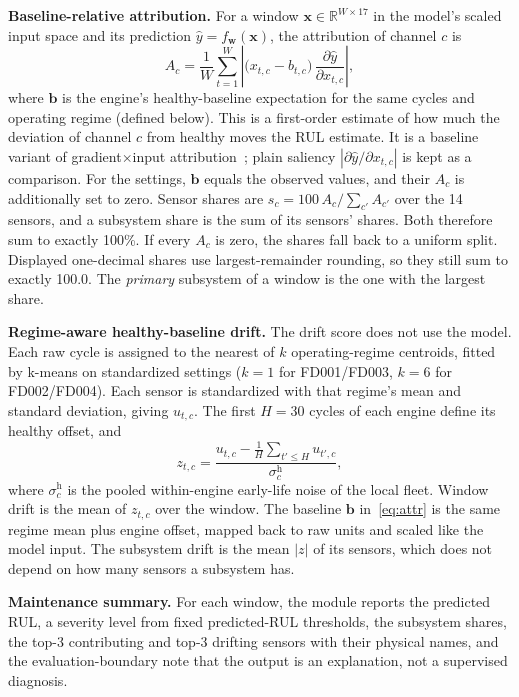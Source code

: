 \textbf{Baseline-relative attribution.} For a window $\mathbf{x}\in\mathbb{R}^{W\times 17}$ in the model's scaled input space and its prediction $\hat y=f_{\mathbf{w}}(\mathbf{x})$, the attribution of channel $c$ is
\begin{equation}
A_c=\frac{1}{W}\sum_{t=1}^{W}\left|\bigl(x_{t,c}-b_{t,c}\bigr)\,\frac{\partial \hat y}{\partial x_{t,c}}\right|,
\label{eq:attr}
\end{equation}
where $\mathbf{b}$ is the engine's healthy-baseline expectation for the same cycles and operating regime (defined below). This is a first-order estimate of how much the deviation of channel $c$ from healthy moves the RUL estimate. It is a baseline variant of gradient$\times$input attribution~\cite{simonyan2014saliency,shrikumar2017deeplift,sundararajan2017axiomatic}; plain saliency $|\partial\hat y/\partial x_{t,c}|$ is kept as a comparison. For the settings, $\mathbf{b}$ equals the observed values, and their $A_c$ is additionally set to zero. Sensor shares are $s_c=100\,A_c/\sum_{c'}A_{c'}$ over the 14 sensors, and a subsystem share is the sum of its sensors' shares. Both therefore sum to exactly 100\%. If every $A_c$ is zero, the shares fall back to a uniform split. Displayed one-decimal shares use largest-remainder rounding, so they still sum to exactly 100.0. The \emph{primary} subsystem of a window is the one with the largest share.

\textbf{Regime-aware healthy-baseline drift.} The drift score does not use the model. Each raw cycle is assigned to the nearest of $k$ operating-regime centroids, fitted by k-means on standardized settings ($k{=}1$ for FD001/FD003, $k{=}6$ for FD002/FD004). Each sensor is standardized with that regime's mean and standard deviation, giving $u_{t,c}$. The first $H{=}30$ cycles of each engine define its healthy offset, and
\begin{equation}
z_{t,c}=\frac{u_{t,c}-\frac{1}{H}\sum_{t'\le H}u_{t',c}}{\sigma^{\text{h}}_c},
\label{eq:drift}
\end{equation}
where $\sigma^{\text{h}}_c$ is the pooled within-engine early-life noise of the local fleet. Window drift is the mean of $z_{t,c}$ over the window. The baseline $\mathbf{b}$ in~\eqref{eq:attr} is the same regime mean plus engine offset, mapped back to raw units and scaled like the model input. The subsystem drift is the mean $|z|$ of its sensors, which does not depend on how many sensors a subsystem has.

\textbf{Maintenance summary.} For each window, the module reports the predicted RUL, a severity level from fixed predicted-RUL thresholds, the subsystem shares, the top-3 contributing and top-3 drifting sensors with their physical names, and the evaluation-boundary note that the output is an explanation, not a supervised diagnosis.
